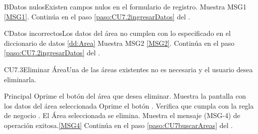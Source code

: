 		 \begin{UCtrayectoriaA}{B}{Datos nulos}{Existen campos nulos en el formulario de registro.}
			\UCpaso Muestra MSG1 \ref{MSG1}.
			\UCpaso Continúa en el paso \ref{paso:CU7.2ingresarDatos} del .
		\end{UCtrayectoriaA}
		 \begin{UCtrayectoriaA}{C}{Datos incorrectos}{Los datos del área no cumplen con lo especificado en el diccionario de datos \ref{dd:Area}}
			\UCpaso Muestra MSG2 \ref{MSG2}.
			\UCpaso Continúa en el paso \ref{paso:CU7.2ingresarDatos} del .
		\end{UCtrayectoriaA}



	\begin{UseCase}{CU7.3}{Eliminar Área}{Una de las áreas existentes no es necesaria y el usuario desea eliminarla.}
	\end{UseCase}

	\begin{UCtrayectoria}{Principal}
			\UCpaso[\UCactor] Oprime el botón  del área que desea eliminar.
			\UCpaso Muestra la pantalla  con los datos del área seleccionada  
			\UCpaso [\UCactor] Oprime el botón .
			\UCpaso Verifica que cumpla con la regla de negocio .  
			\UCpaso El Área seleccionada se elimina.
			\UCpaso Muestra el mensaje (MSG-4) de operación exitosa.\ref{MSG4}
			\UCpaso Continúa en el paso \ref{paso:CU7buscarAreas} del .
	\end{UCtrayectoria}

